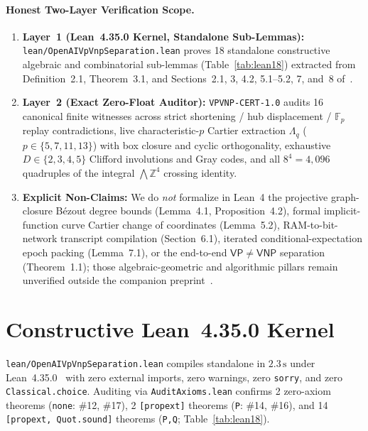 \documentclass[10pt,twocolumn]{article}
\newcommand{\ZZ}{\mathbb{Z}}
\newcommand{\FF}{\mathbb{F}}
\begin{document}
\paragraph{Honest Two-Layer Verification Scope.}
\begin{enumerate}[leftmargin=1.2em,itemsep=1pt,topsep=2pt]
  \item \textbf{Layer~1 (Lean~4.35.0 Kernel, Standalone Sub-Lemmas):} \texttt{lean/OpenAI\allowbreak VpVnpSeparation.lean} proves 18 standalone constructive algebraic and combinatorial sub-lemmas (Table~\ref{tab:lean18}) extracted from Definition~2.1, Theorem~3.1, and Sections~2.1, 3, 4.2, 5.1--5.2, 7, and~8 of~\cite{openai2026vpvnp}.
  \item \textbf{Layer~2 (Exact Zero-Float Auditor):} \texttt{VPVNP-CERT-1.0} audits 16 canonical finite witnesses across strict shortening / hub displacement / $\FF_p$ replay contradictions, live characteristic-$p$ Cartier extraction $\Lambda_q$ ($p\in\{5,7,11,13\}$) with box closure and cyclic orthogonality, exhaustive $D\in\{2,3,4,5\}$ Clifford involutions and Gray codes, and all $8^4=4{,}096$ quadruples of the integral $\bigwedge\ZZ^4$ crossing identity.
  \item \textbf{Explicit Non-Claims:} We do \emph{not} formalize in Lean~4 the projective graph-closure Bézout degree bounds (Lemma~4.1, Proposition~4.2), formal implicit-function curve Cartier change of coordinates (Lemma~5.2), RAM-to-bit-network transcript compilation (Section~6.1), iterated conditional-expectation epoch packing (Lemma~7.1), or the end-to-end $\mathsf{VP}\neq\mathsf{VNP}$ separation (Theorem~1.1); those algebraic-geometric and algorithmic pillars remain unverified outside the companion preprint~\cite{openai2026vpvnp}.
\end{enumerate}

\section{Constructive Lean~4.35.0 Kernel}\label{sec:lean}
\texttt{lean/OpenAI\allowbreak VpVnpSeparation.lean} compiles standalone in $2.3\,\mathrm{s}$ under Lean~4.35.0~\cite{demoura2021lean4} with zero external imports, zero warnings, zero \texttt{sorry}, and zero \texttt{Classical.choice}. Auditing via \texttt{AuditAxioms.lean} confirms 2 zero-axiom theorems (\texttt{none}: \#12, \#17), 2 \texttt{[propext]} theorems (\texttt{P}: \#14, \#16), and 14 \texttt{[propext, Quot.sound]} theorems (\texttt{P,Q}; Table~\ref{tab:lean18}).
\end{document}
